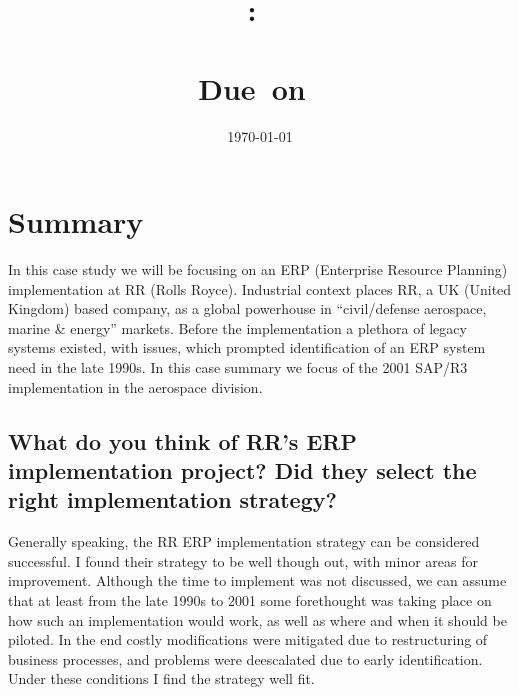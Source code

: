 \documentclass{article}
\title{
    \vspace{2in}
    \textmd{\textbf{\hmwkClass:\ \\ \hmwkTitle}}\\
    \normalsize\vspace{0.1in}\small{Due\ on\ \hmwkDueDate}\\
    \vspace{0.1in}\Large{\textit{\paprTitle}}
    \vspace{3in}
}
\author{\hmwkAuthorName}
\date{\today}
\begin{document}
\maketitle

\pagebreak

\tableofcontents
\newpage

\section{Summary}
In this case study we will be focusing on an ERP (Enterprise Resource Planning) implementation at RR (Rolls Royce).
Industrial context places RR, a UK (United Kingdom) based company, as a global powerhouse in ``civil/defense aerospace, marine \& energy'' markets.
Before the implementation a plethora of legacy systems existed, with issues, which prompted identification of an ERP system need in the late 1990s.
In this case summary we focus of the 2001 SAP/R3 implementation in the aerospace division.

\subsection{What do you think of RR's ERP implementation project? Did they select the right
implementation strategy?}
Generally speaking, the RR ERP implementation strategy can be considered successful.
I found their strategy to be well though out, with minor areas for improvement.
Although the time to implement was not discussed, we can assume that at least from the late 1990s to 2001 some forethought was taking place on how such an implementation would work, as well as where and when it should be piloted.
In the end costly modifications were mitigated due to restructuring of business processes, and problems were deescalated due to early identification.
Under these conditions I find the strategy well fit.
\end{document}
